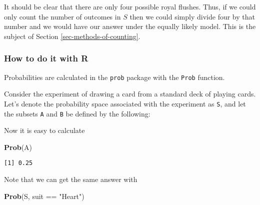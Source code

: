 \documentclass[]{book}
\newenvironment{Shaded}{\begin{snugshade}}{\end{snugshade}}
\newcommand{\KeywordTok}[1]{\textcolor[rgb]{0.13,0.29,0.53}{\textbf{{#1}}}}
\newcommand{\DataTypeTok}[1]{\textcolor[rgb]{0.13,0.29,0.53}{{#1}}}
\newcommand{\DecValTok}[1]{\textcolor[rgb]{0.00,0.00,0.81}{{#1}}}
\newcommand{\StringTok}[1]{\textcolor[rgb]{0.31,0.60,0.02}{{#1}}}
\newcommand{\OtherTok}[1]{\textcolor[rgb]{0.56,0.35,0.01}{{#1}}}
\newcommand{\NormalTok}[1]{{#1}}
\numberwithin{equation}{chapter}
\numberwithin{figure}{chapter}
\theoremstyle{plain}
\theoremstyle{definition}
\theoremstyle{remark}
\theoremstyle{definition}
\theoremstyle{definition}
\theoremstyle{remark}
\begin{document}
It should be clear that there are only four possible royal flushes.
Thus, if we could only count the number of outcomes in \(S\) then we
could simply divide four by that number and we would have our answer
under the equally likely model. This is the subject of Section
\ref{sec-methods-of-counting}.

\subsubsection{How to do it with R}\label{how-to-do-it-with-r-12}

Probabilities are calculated in the \texttt{prob} package
\autocite{prob} with the \texttt{Prob} function.

Consider the experiment of drawing a card from a standard deck of
playing cards. Let's denote the probability space associated with the
experiment as \texttt{S}, and let the subsets \texttt{A} and \texttt{B}
be defined by the following:

\begin{Shaded}
\end{Shaded}

Now it is easy to calculate

\begin{Shaded}
\begin{Highlighting}[]
\KeywordTok{Prob}\NormalTok{(A) }
\end{Highlighting}
\end{Shaded}

\begin{verbatim}
[1] 0.25
\end{verbatim}

Note that we can get the same answer with

\begin{Shaded}
\begin{Highlighting}[]
\KeywordTok{Prob}\NormalTok{(S, suit ==}\StringTok{ "Heart"}\NormalTok{) }
\end{Highlighting}
\end{Shaded}
\end{document}

